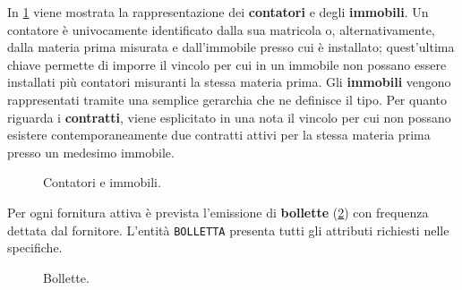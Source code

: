 \documentclass[a4paper,12pt]{report}
\begin{document}
In \cref{fig:meters_premises} viene mostrata la rappresentazione dei \textbf{contatori} e degli \textbf{immobili}. Un contatore è univocamente identificato dalla sua matricola o, alternativamente, dalla materia prima misurata e dall'immobile presso cui è installato; quest'ultima chiave permette di imporre il vincolo per cui in un immobile non possano essere installati più contatori misuranti la stessa materia prima.
\newline
Gli \textbf{immobili} vengono rappresentati tramite una semplice gerarchia che ne definisce il tipo.
\newline
Per quanto riguarda i \textbf{contratti}, viene esplicitato in una nota il vincolo per cui non possano esistere contemporaneamente due contratti attivi per la stessa materia prima presso un medesimo immobile.

\begin{figure}[H]
\centering{}
\caption{Contatori e immobili.}
\label{fig:meters_premises}
\end{figure}


Per ogni fornitura attiva è prevista l'emissione di \textbf{bollette} (\cref{fig:reports}) con frequenza dettata dal fornitore. L'entità \texttt{BOLLETTA} presenta tutti gli attributi richiesti nelle specifiche.

\begin{figure}[H]
\centering{}
\caption{Bollette.}
\label{fig:reports}
\end{figure}
\end{document}
